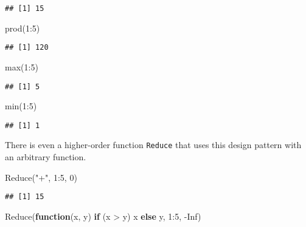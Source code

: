 \documentclass[
]{article}
\newenvironment{Shaded}{\begin{snugshade}}{\end{snugshade}}
\newcommand{\ConstantTok}[1]{\textcolor[rgb]{0.00,0.00,0.00}{#1}}
\newcommand{\ControlFlowTok}[1]{\textcolor[rgb]{0.13,0.29,0.53}{\textbf{#1}}}
\newcommand{\DecValTok}[1]{\textcolor[rgb]{0.00,0.00,0.81}{#1}}
\newcommand{\FunctionTok}[1]{\textcolor[rgb]{0.00,0.00,0.00}{#1}}
\newcommand{\NormalTok}[1]{#1}
\newcommand{\SpecialCharTok}[1]{\textcolor[rgb]{0.00,0.00,0.00}{#1}}
\newcommand{\StringTok}[1]{\textcolor[rgb]{0.31,0.60,0.02}{#1}}
\begin{document}
\begin{verbatim}
## [1] 15
\end{verbatim}

\begin{Shaded}
\begin{Highlighting}[]
\FunctionTok{prod}\NormalTok{(}\DecValTok{1}\SpecialCharTok{:}\DecValTok{5}\NormalTok{)}
\end{Highlighting}
\end{Shaded}

\begin{verbatim}
## [1] 120
\end{verbatim}

\begin{Shaded}
\begin{Highlighting}[]
\FunctionTok{max}\NormalTok{(}\DecValTok{1}\SpecialCharTok{:}\DecValTok{5}\NormalTok{)}
\end{Highlighting}
\end{Shaded}

\begin{verbatim}
## [1] 5
\end{verbatim}

\begin{Shaded}
\begin{Highlighting}[]
\FunctionTok{min}\NormalTok{(}\DecValTok{1}\SpecialCharTok{:}\DecValTok{5}\NormalTok{)}
\end{Highlighting}
\end{Shaded}

\begin{verbatim}
## [1] 1
\end{verbatim}

There is even a higher-order function \texttt{Reduce} that uses this
design pattern with an arbitrary function.

\begin{Shaded}
\begin{Highlighting}[]
\FunctionTok{Reduce}\NormalTok{(}\StringTok{"+"}\NormalTok{, }\DecValTok{1}\SpecialCharTok{:}\DecValTok{5}\NormalTok{, }\DecValTok{0}\NormalTok{)}
\end{Highlighting}
\end{Shaded}

\begin{verbatim}
## [1] 15
\end{verbatim}

\begin{Shaded}
\begin{Highlighting}[]
\FunctionTok{Reduce}\NormalTok{(}\ControlFlowTok{function}\NormalTok{(x, y) }\ControlFlowTok{if}\NormalTok{ (x }\SpecialCharTok{\textgreater{}}\NormalTok{ y) x }\ControlFlowTok{else}\NormalTok{ y, }\DecValTok{1}\SpecialCharTok{:}\DecValTok{5}\NormalTok{, }\SpecialCharTok{{-}}\ConstantTok{Inf}\NormalTok{)}
\end{Highlighting}
\end{Shaded}
\end{document}
